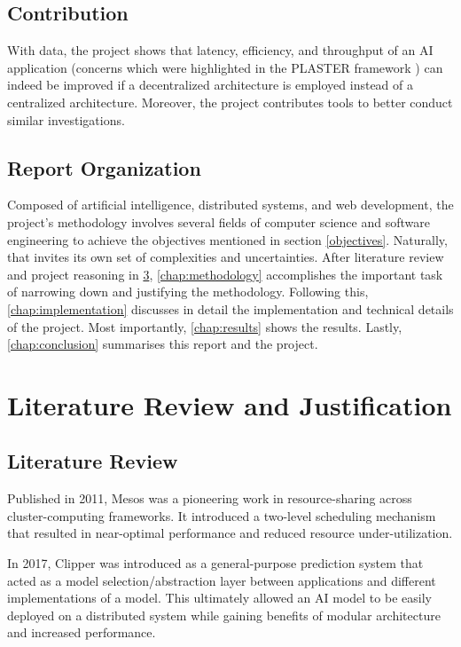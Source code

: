 \documentclass{report}
\begin{document}
\section{Contribution}\label{contribution}

With data, the project shows that latency, efficiency, and throughput of an AI application (concerns which were highlighted in the PLASTER framework \cite{Teich2018}) can indeed be improved if a decentralized architecture is employed instead of a centralized architecture.
Moreover, the project contributes tools to better conduct similar investigations.

\section{Report Organization}

Composed of artificial intelligence, distributed systems, and web development, the project's methodology involves several fields of computer science and software engineering to achieve the objectives mentioned in section \ref{objectives}.
Naturally, that invites its own set of complexities and uncertainties. 
After literature review and project reasoning in \cref{litreview}, \cref{chap:methodology} accomplishes the important task of narrowing down and justifying the methodology.
Following this, \cref{chap:implementation} discusses in detail the implementation and technical details of the project.
Most importantly, \cref{chap:results} shows the results.
Lastly, \cref{chap:conclusion} summarises this report and the project.

\chapter{Literature Review and Justification}\label{litreview}

\section{Literature Review}

Published in 2011, Mesos \cite{Mesos} was a pioneering work in resource-sharing across cluster-computing frameworks.
It introduced a two-level scheduling mechanism that resulted in near-optimal performance and reduced resource under-utilization.

In 2017, Clipper \cite{Clipper} was introduced as a general-purpose prediction system that acted as a model selection/abstraction layer between applications and different implementations of a model.
This ultimately allowed an AI model to be easily deployed on a distributed system while gaining benefits of modular architecture and increased performance.
\end{document}

